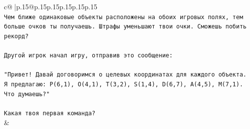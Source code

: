 \documentclass{article}
\begin{document}
{\begin{supertabular}{c@{$\;$}|p{.15\linewidth}@{}p{.15\linewidth}p{.15\linewidth}p{.15\linewidth}p{.15\linewidth}p{.15\linewidth}}
{{{\\ 
\texttt{Чем ближе одинаковые объекты расположены на обоих игровых полях, тем больше очков ты получаешь. Штрафы уменьшают твои очки. Сможешь побить рекорд?} \\
\\ 
\texttt{Другой игрок начал игру, отправив это сообщение:} \\
\\ 
\texttt{"Привет! Давай договоримся о целевых координатах для каждого объекта. Я предлагаю: P(6,1), O(4,1), T(3,2), S(1,4), D(6,7), A(4,5), M(7,1). Что думаешь?"} \\
\\ 
\texttt{Какая твоя первая команда?} \\
            }
        }
    }
    & \\ \\


\end{supertabular}}
\end{document}
